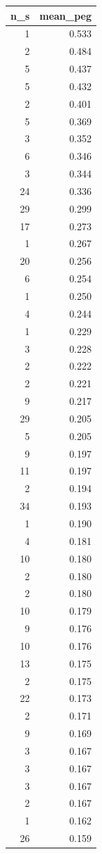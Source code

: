 \begin{tabular}{rr}
\toprule
n_s & mean_peg \\
\midrule
1 & 0.533 \\
2 & 0.484 \\
5 & 0.437 \\
5 & 0.432 \\
2 & 0.401 \\
5 & 0.369 \\
3 & 0.352 \\
6 & 0.346 \\
3 & 0.344 \\
24 & 0.336 \\
29 & 0.299 \\
17 & 0.273 \\
1 & 0.267 \\
20 & 0.256 \\
6 & 0.254 \\
1 & 0.250 \\
4 & 0.244 \\
1 & 0.229 \\
3 & 0.228 \\
2 & 0.222 \\
2 & 0.221 \\
9 & 0.217 \\
29 & 0.205 \\
5 & 0.205 \\
9 & 0.197 \\
11 & 0.197 \\
2 & 0.194 \\
34 & 0.193 \\
1 & 0.190 \\
4 & 0.181 \\
10 & 0.180 \\
2 & 0.180 \\
2 & 0.180 \\
10 & 0.179 \\
9 & 0.176 \\
10 & 0.176 \\
13 & 0.175 \\
2 & 0.175 \\
22 & 0.173 \\
2 & 0.171 \\
9 & 0.169 \\
3 & 0.167 \\
3 & 0.167 \\
3 & 0.167 \\
2 & 0.167 \\
1 & 0.162 \\
26 & 0.159 \\

\end{tabular}

